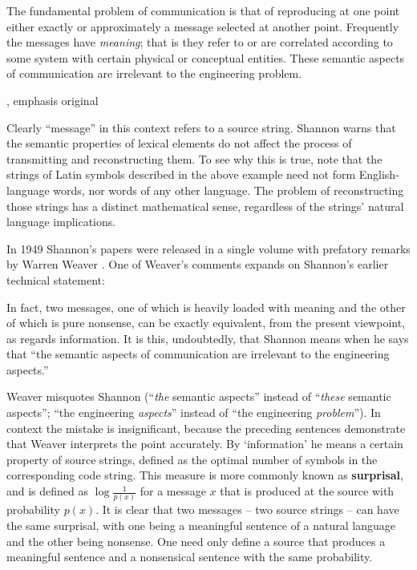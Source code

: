 \documentclass[12pt]{article}
\begin{document}
\begin{myquote}
The fundamental problem of communication is that of reproducing at one point either exactly or approximately a message selected at another point. Frequently the messages have \emph{meaning}; that is they refer to or are correlated according to some system with certain physical or conceptual entities. These semantic aspects of communication are irrelevant to the engineering problem.
\par\hspace*{\fill}\citet[379]{shannon1948mathematicalc}, emphasis original
\end{myquote}

\noindent Clearly ``message'' in this context refers to a source string.
Shannon warns that the semantic properties of lexical elements do not affect the process of transmitting and reconstructing them.
To see why this is true, note that the strings of Latin symbols described in the above example need not form English-language words, nor words of any other language.
The problem of reconstructing those strings has a distinct mathematical sense, regardless of the strings' natural language implications.

In 1949 Shannon's papers were released in a single volume with prefatory remarks by Warren Weaver \citep{shannon1949mathematical}.
One of Weaver's comments expands on Shannon's earlier technical statement:

\begin{myquote}
In fact, two messages, one of which is heavily loaded with meaning and the other of which is pure nonsense, can be exactly equivalent, from the present viewpoint, as regards information. It is this, undoubtedly, that Shannon means when he says that ``the semantic aspects of communication are irrelevant to the engineering aspects.''
\par\hspace*{\fill}\citet[8]{shannon1949mathematical}
\end{myquote}

\noindent Weaver misquotes Shannon (``\emph{the} semantic aspects'' instead of ``\emph{these} semantic aspects''; ``the engineering \textit{aspects}'' instead of ``the engineering \textit{problem}'').
In context the mistake is insignificant, because the preceding sentences demonstrate that Weaver interprets the point accurately.
By `information' he means a certain property of source strings, defined as the optimal number of symbols in the corresponding code string.
This measure is more commonly known as \textbf{surprisal}, and is defined as $\log{\frac{1}{p(x)}}$ for a message $x$ that is produced at the source with probability $p(x)$.
It is clear that two messages -- two source strings -- can have the same surprisal, with one being a meaningful sentence of a natural language and the other being nonsense.
One need only define a source that produces a meaningful sentence and a nonsensical sentence with the same probability.
\end{document}
